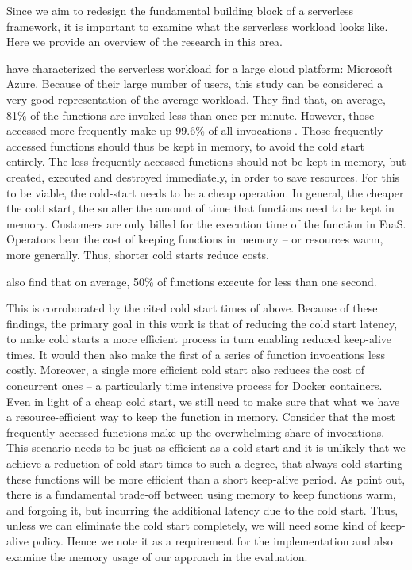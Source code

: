 Since we aim to redesign the fundamental building block of a serverless framework, it is important to examine what the serverless workload looks like. Here we provide an overview of the research in this area.

\citeauthor{Shahrad2020} have characterized the serverless workload for a large cloud platform: Microsoft Azure. Because of their large number of users, this study can be considered a very good representation of the average workload.
They find that, on average, 81\% of the functions are invoked less than once per minute. However, those accessed more frequently make up 99.6\% of all invocations \cite{Shahrad2020}.
Those frequently accessed functions should thus be kept in memory, to avoid the cold start entirely. The less frequently accessed functions should not be kept in memory, but created, executed and destroyed immediately, in order to save resources. For this to be viable, the cold-start needs to be a cheap operation. In general, the cheaper the cold start, the smaller the amount of time that functions need to be kept in memory.
Customers are only billed for the execution time of the function in FaaS. Operators bear the cost of keeping functions in memory -- or resources warm, more generally. Thus, shorter cold starts reduce costs.

\citeauthor{Shahrad2020} also find that on average, 50\% of functions execute for less than one second.

\begin{quote}
\end{quote}

This is corroborated by the cited cold start times of \citeauthor{Wang2018} above.
Because of these findings, the primary goal in this work is that of reducing the cold start latency, to make cold starts a more efficient process in turn enabling reduced keep-alive times. It would then also make the first of a series of function invocations less costly. Moreover, a single more efficient cold start also reduces the cost of concurrent ones -- a particularly time intensive process for Docker containers.
Even in light of a cheap cold start, we still need to make sure that what we have a resource-efficient way to keep the function in memory. Consider that the most frequently accessed functions make up the overwhelming share of invocations. This scenario needs to be just as efficient as a cold start and it is unlikely that we achieve a reduction of cold start times to such a degree, that always cold starting these functions will be more efficient than a short keep-alive period.
As \citeauthor{Shahrad2020} point out, there is a fundamental trade-off between using memory to keep functions warm, and forgoing it, but incurring the additional latency due to the cold start. Thus, unless we can eliminate the cold start completely, we will need some kind of keep-alive policy. Hence we note it as a requirement for the implementation and also examine the memory usage of our approach in the evaluation.

